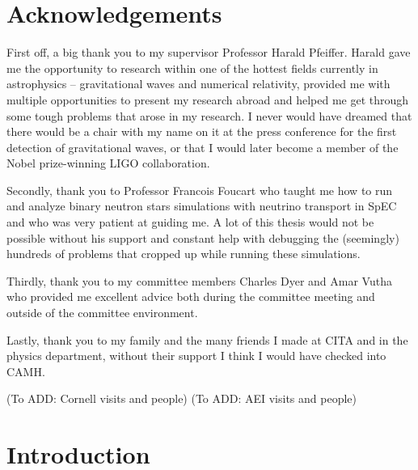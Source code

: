 \documentclass{ut-thesis}
\begin{document}



\section{Acknowledgements}

First off, a big thank you to my supervisor Professor Harald Pfeiffer. Harald gave me the opportunity to research within one of the hottest fields currently in astrophysics -- gravitational waves and numerical relativity, provided me with multiple opportunities to present my research abroad and helped me get through some tough problems that arose in my research. I never would have dreamed that there would be a chair with my name on it at the press conference for the first detection of gravitational waves, or that I would later become a member of the Nobel prize-winning LIGO collaboration. 

Secondly, thank you to Professor Francois Foucart who taught me how to run and analyze binary neutron stars simulations with neutrino transport in SpEC and who was very patient at guiding me. A lot of this thesis would not be possible without his support and constant help with debugging the (seemingly) hundreds of problems that cropped up while running these simulations.

Thirdly, thank you to my committee members Charles Dyer and Amar Vutha who provided me excellent advice both during the committee meeting and outside of the committee environment.

Lastly, thank you to my family and the many friends I made at CITA and in the physics department, without their support I think I would have checked into CAMH.

(To ADD: Cornell visits and people) 
(To ADD: AEI visits and people)

\section{Introduction}

\end{document}
